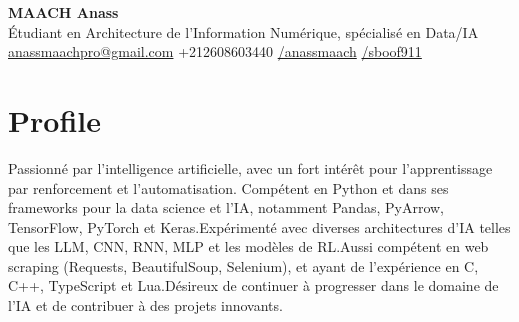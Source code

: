 \documentclass[a4paper,11pt]{article}%
\begin{document}
%
\normalsize%
\begin{center}%
{\Huge \textbf{MAACH Anass}}\\[0.3em]%
\'Etudiant en Architecture de l{\textquoteright}Information Num\'erique, sp\'ecialis\'e en Data/IA\\[0.3em]%
\href{mailto:anassmaachpro@gmail.com}{anassmaachpro@gmail.com}%
 \quad +212608603440 \quad %
\href{https://www.linkedin.com/in/anassmaach}{/anassmaach} \quad %
\href{https://github.com/sboof911}{/sboof911}%
\end{center}%
\section*{Profile}%
Passionn\'e par l{\textquoteright}intelligence artificielle, avec un fort int\'er\^et pour l{\textquoteright}apprentissage par renforcement et l{\textquoteright}automatisation. Comp\'etent en Python et dans ses frameworks pour la data science et l{\textquoteright}IA, notamment Pandas, PyArrow, TensorFlow, PyTorch et Keras.\newline Exp\'eriment\'e avec diverses architectures d{\textquoteright}IA telles que les LLM, CNN, RNN, MLP et les mod\`eles de RL.\newline \newline Aussi comp\'etent en web scraping (Requests, BeautifulSoup, Selenium), et ayant de l{\textquoteright}exp\'erience en C, C++, TypeScript et Lua.\newline D\'esireux de continuer \`a progresser dans le domaine de l{\textquoteright}IA et de contribuer \`a des projets innovants.%
\end{document}
